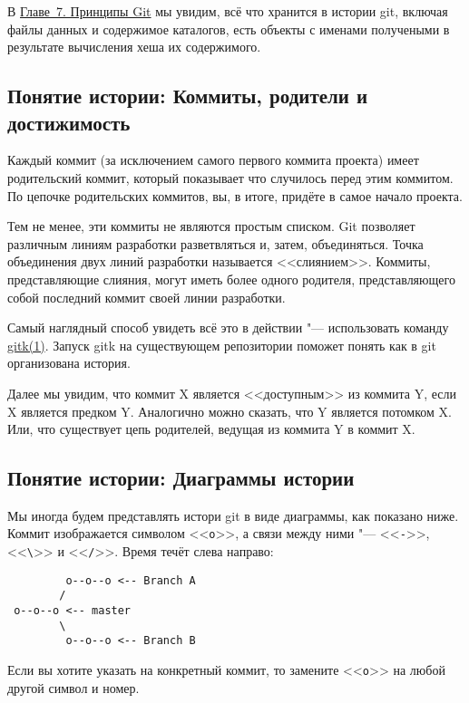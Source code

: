 \documentclass[a4paper, 12pt]{report}
\begin{document}
В \href{#chapter7}{Главе~7. Принципы Git} мы увидим, всё что хранится в истории git,
включая файлы данных и содержимое каталогов, есть объекты с именами получеными в
результате вычисления хеша их содержимого.


\subsection{Понятие истории: Коммиты, родители и достижимость}

Каждый коммит (за исключением самого первого коммита проекта) имеет родительский
коммит, который показывает что случилось перед этим коммитом. По цепочке родительских
коммитов, вы, в итоге, придёте в самое начало проекта. 

Тем не менее, эти коммиты не являются простым списком. Git позволяет различным
линиям разработки разветвляться и, затем, объединяться. Точка объединения двух
линий разработки называется <<слиянием>>. Коммиты, представляющие слияния, могут
иметь более одного родителя, представляющего собой последний коммит своей линии
разработки.

Самый наглядный способ увидеть всё это в действии "--- использовать команду
\href{http://www.kernel.org/pub/software/scm/git/docs/gitk.html}{gitk(1)}. 
Запуск gitk на существующем репозитории поможет понять как в git организована
история.

Далее мы увидим, что коммит X является <<доступным>> из коммита Y, если X является
предком Y. Аналогично можно сказать, что Y является потомком X. Или, что существует
цепь родителей, ведущая из коммита Y в коммит X.


\subsection{Понятие истории: Диаграммы истории}

Мы иногда будем представлять истори git в виде диаграммы, как показано ниже. Коммит
изображается символом <<\texttt{\small o}>>, а связи между ними "--- <<\texttt{\small -}>>, 
<<\texttt{\small \textbackslash}>> и <<\texttt{\small /}>>. Время течёт слева направо:

\begin{lstlisting}
         o--o--o <-- Branch A
        /
 o--o--o <-- master
        \
         o--o--o <-- Branch B
\end{lstlisting}

Если вы хотите указать на конкретный коммит, то замените <<\texttt{\small o}>> на любой другой
символ и номер.
\end{document}
